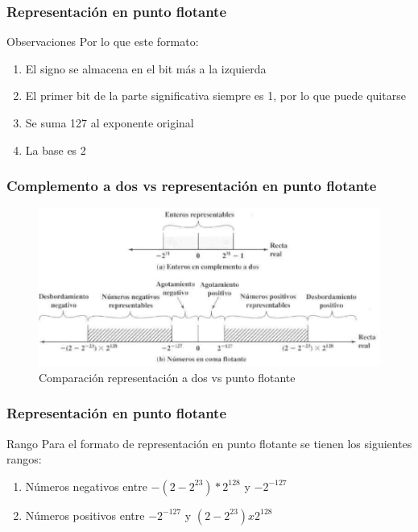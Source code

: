 \documentclass{beamer}
\begin{document}
\begin{frame}
	\frametitle{Representación en punto flotante}
	\begin{block}{Observaciones}
		Por lo que este formato:
		\begin{enumerate}
			\item El signo se almacena en el bit más a la izquierda
			\item El primer bit de la parte significativa siempre es 1, por lo que puede quitarse
			\item Se suma 127 al exponente original
			\item La base es 2
		\end{enumerate}
	\end{block}
\end{frame}


\begin{frame}
	\frametitle{Complemento a dos vs representación en punto flotante}
	\begin{figure}[H]
	\centering
	\includegraphics[scale=0.3]{imagenes/complementoa2puntoflotante.png}
	\caption{Comparación representación a dos vs punto flotante}
	\end{figure}	
\end{frame}

\begin{frame}
	\frametitle{Representación en punto flotante}
	\begin{block}{Rango}
		Para el formato de representación en punto flotante se tienen los siguientes rangos:
		\begin{enumerate}
			\item Números negativos entre $-(2 - 2^{23}) * 2^{128}$ y $-2^{-127}$
			\item Números positivos entre $-2^{-127}$ y $(2 - 2^{23}) x 2^{128}$ 
		\end{enumerate}
	\end{block}
\end{frame}
\end{document}
